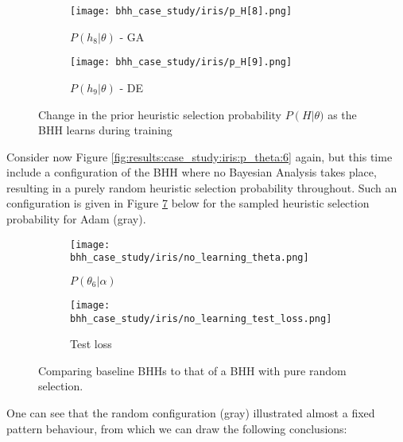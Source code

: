 \begin{figure}[htbp]
\begin{subfigure}{0.5\textwidth}
		\label{fig:results:case_study:iris:p_H:7}
	\end{subfigure}
	\par\medskip
	\begin{subfigure}{0.5\textwidth}
		\centering
		\texttt{[image: bhh\_case\_study/iris/p\_H[8].png]}
		\caption{$P\left(h_{8} | \theta \right)$ - \Acs{GA}}
		\label{fig:results:case_study:iris:p_H:8}
	\end{subfigure}
	\begin{subfigure}{0.5\textwidth}
		\centering
		\texttt{[image: bhh\_case\_study/iris/p\_H[9].png]}
		\caption{$P\left(h_{9} | \theta \right)$ - \Acs{DE}}
		\label{fig:results:case_study:iris:p_H:9}
	\end{subfigure}
	\par\medskip
	\caption{Change in the prior heuristic selection probability $P\left(H\right | \theta )$ as the \Ac{BHH} learns during training}
	\label{fig:results:case_study:iris:p_H}
\end{figure}


Consider now Figure \ref{fig:results:case_study:iris:p_theta:6} again, but this time include a configuration of the \Acs{BHH} where no Bayesian Analysis takes place, resulting in a purely random heuristic selection probability throughout. Such an configuration is given in Figure \ref{fig:results:case_study:iris:no_learn:metrics} below for the sampled heuristic selection probability for \Acs{Adam} (gray).

\begin{figure}[htbp]
	\begin{subfigure}{0.5\textwidth}
		\centering
		\texttt{[image: bhh\_case\_study/iris/no\_learning\_theta.png]}
		\caption{$P(\theta_{6} | \alpha)$}
		\label{fig:results:case_study:iris:no_learn:p_theta}
	\end{subfigure}
	\begin{subfigure}{0.5\textwidth}
		\centering
		\texttt{[image: bhh\_case\_study/iris/no\_learning\_test\_loss.png]}
		\caption{Test loss}
		\label{fig:results:case_study:iris:no_learn:test:loss}
	\end{subfigure}
	\par\bigskip
	\caption{Comparing baseline \Acp{BHH} to that of a \Ac{BHH} with pure random selection.}
	\label{fig:results:case_study:iris:no_learn:metrics}
\end{figure}

One can see that the random configuration (gray) illustrated almost a fixed pattern behaviour, from which we can draw the following conclusions:

